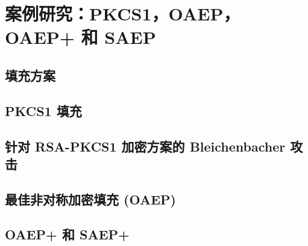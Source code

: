 \section{案例研究：PKCS1，OAEP，OAEP+ 和 SAEP}\label{sec:12-8}

\subsection{填充方案}\label{subsec:12-8-1}

\begin{definition}\label{def:12-8}
	
\end{definition}

\subsection{PKCS1 填充}\label{subsec:12-8-2}

\subsection{针对 RSA-PKCS1 加密方案的 Bleichenbacher 攻击}\label{subsec:12-8-3}

\subsection{最佳非对称加密填充 (OAEP)}\label{subsec:12-8-4}

\begin{game}[部分单向陷门函数方案]\label{game:12-7}
	
\end{game}

\begin{definition}\label{def:12-9}
	
\end{definition}

\begin{theorem}\label{theo:12-13}
	
\end{theorem}

\subsection{OAEP+ 和 SAEP+}\label{subsec:12-8-5}
